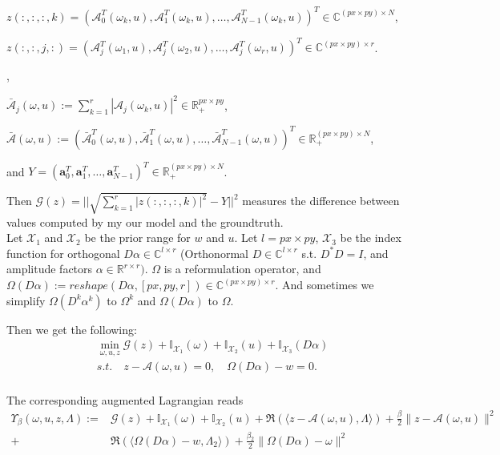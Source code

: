 \documentclass{article}
\numberwithin{equation}{section}
\begin{document}
$z(:,:,:,k) =\left(\mathcal{A}_{0}^{T}(\omega_k, u), \mathcal{A}_{1}^{T}(\omega_k, u), \ldots, \mathcal{A}_{N-1}^{T}(\omega_k, u)\right)^{T} 
\in \mathbb{C}^{(px\times py) \times N}$,

$z(:,:,j,:) =\left(\mathcal{A}_{j}^{T}(\omega_1, u), \mathcal{A}_{j}^{T}(\omega_2, u), \ldots, \mathcal{A}_{j}^{T}(\omega_r, u)\right)^{T} 
\in \mathbb{C}^{(px\times py) \times r}$.


,

$\bar{\mathcal{A}}_{j}(\omega, u):= \sum_{k=1}^r |\mathcal{A}_{j}(\omega_k, u)|^2 \in \mathbb{R}_+^{px\times py}$,

 $\bar{\mathcal{A}}(\omega, u):=\left(\bar{\mathcal{A}}_{0}^{T}(\omega, u), \bar{\mathcal{A}}_{1}^{T}(\omega, u), \ldots,\bar{\mathcal{A}}_{N-1}^{T}(\omega, u)\right)^{T} 
\in \mathbb{R}_+^{(px\times py) \times N}$,
 

 
and $Y=\left(\boldsymbol{a}_{0}^{T}, \boldsymbol{a}_{1}^{T}, \ldots, \boldsymbol{a}_{N-1}^{T}\right)^{T} \in \mathbb{R}_{+}^{(px \times py) \times N }$.




 Then $\mathcal{G}(z)= || \sqrt{ \sum_{k=1}^{r} |z(:,:,:,k)|^2} - Y||^2$ measures the difference between values computed by my our model and the groundtruth. \\
 Let $\mathcal{X}_{1}$ and $\mathcal{X}_{2}$ be the prior range for $w$ and $u$. Let  $l=px \times py$, $\mathcal{X}_{3}$ be the index function for orthogonal $D\alpha \in \mathbb{C}^{l \times r}$ (Orthonormal $D \in  \mathbb{C}^{l \times r}$ s.t. $D^*D=I$, and amplitude factors $\alpha \in  \mathbb{R}^{r \times r})$.
 $\Omega$ is a reformulation operator, and $\Omega(D\alpha) := reshape(D\alpha,[px,py,r]) \in \mathbb{C}^{(px \times py) \times r}$. And sometimes we simplify $\Omega(D^k\alpha^k)$ to $\Omega^k$ and $\Omega(D\alpha)$ to $\Omega$.
 
  Then we get the following:
\begin{equation}
\begin{aligned}
&\min _{\omega, u, z} \mathcal{G}(z)+\mathbb{I}_{\mathcal{X}_{1}}(\omega)+\mathbb{I}_{\mathcal{X}_{2}}(u)
+ \mathbb{I}_{\mathcal{X}_{3}}(D\alpha) \\
 &s.t. \quad z-\mathcal{A}(\omega, u)=0, \quad \Omega(D\alpha) - w = 0. \\
\end{aligned}
\end{equation}

The corresponding augmented Lagrangian reads
$$
\begin{aligned}
\Upsilon_{\beta}(\omega, u, z, \Lambda):=&\mathcal{G}(z)+\mathbb{I}_{\mathcal{X}_{1}}(\omega)+\mathbb{I}_{\mathcal{X}_{2}}(u)+\Re(\langle z-\mathcal{A}(\omega, u), \Lambda\rangle)+\frac{\beta}{2}\|z-\mathcal{A}(\omega, u)\|^{2}
\\
+&\Re(\langle \Omega(D\alpha) - w, \Lambda_2\rangle)+\frac{\beta_2}{2}\| \Omega(D\alpha) - \omega\|^{2}
\end{aligned}
$$
\end{document}

